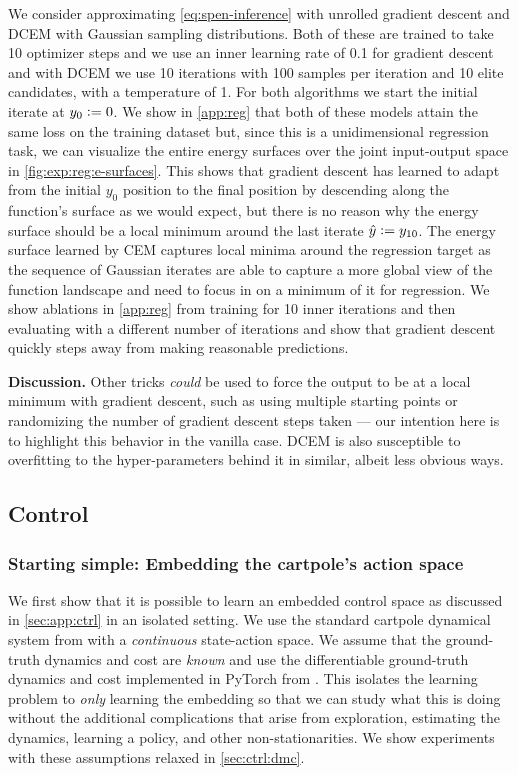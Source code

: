 \documentclass{article}
\begin{document}
We consider approximating \cref{eq:spen-inference} with unrolled
gradient descent and DCEM with Gaussian sampling distributions.
Both of these are trained to take 10
optimizer steps and we use an inner learning rate of 0.1 for
gradient descent and with DCEM we use 10 iterations with
100 samples per iteration and 10 elite candidates, with
a temperature of 1.
For both algorithms we start the initial iterate at $y_0\vcentcolon= 0$.
We show in \cref{app:reg} that both of these models attain the
same loss on the training dataset but, since this is a unidimensional
regression task, we can visualize the entire energy surfaces
over the joint input-output space in \cref{fig:exp:reg:e-surfaces}.
This shows that gradient descent has learned to adapt from the
initial $y_0$ position to the final position by descending
along the function's surface as we would expect, but there
is no reason why the energy surface should be a local minimum
around the last iterate $\hat y \vcentcolon= y_{10}$.
The energy surface learned by CEM captures local minima around
the regression target as the sequence of Gaussian iterates
are able to capture a more global view of the function landscape
and need to focus in on a minimum of it for regression.
We show ablations in \cref{app:reg} from training for 10 inner
iterations and then evaluating with a different number of iterations
and show that gradient descent quickly steps away from
making reasonable predictions.

\textbf{Discussion.}
Other tricks \emph{could} be used to force the output
to be at a local minimum with gradient descent, such as
using multiple starting points or randomizing the number of
gradient descent steps taken --- our intention here is to
highlight this behavior in the vanilla case.
DCEM is also susceptible to overfitting to the
hyper-parameters behind it in similar, albeit less obvious ways.

\subsection{Control}
\label{sec:ctrl}
\subsubsection{Starting simple: Embedding the cartpole's action space}
\label{sec:ctrl:cp}
We first show that it is possible to learn an embedded control
space as discussed in \cref{sec:app:ctrl} in an isolated setting.
We use the standard cartpole dynamical system from
\citet{barto1983neuronlike} with a \emph{continuous} state-action space.
We assume that the ground-truth dynamics and cost are \emph{known}
and use the differentiable ground-truth dynamics and cost implemented
in PyTorch from \citet{amos2018differentiable}.
This isolates the learning problem to \emph{only} learning
the embedding so that we can study what this is doing
without the additional complications that arise from
exploration, estimating the dynamics, learning a policy,
and other non-stationarities.
We show experiments with these assumptions relaxed in \cref{sec:ctrl:dmc}.
\end{document}
